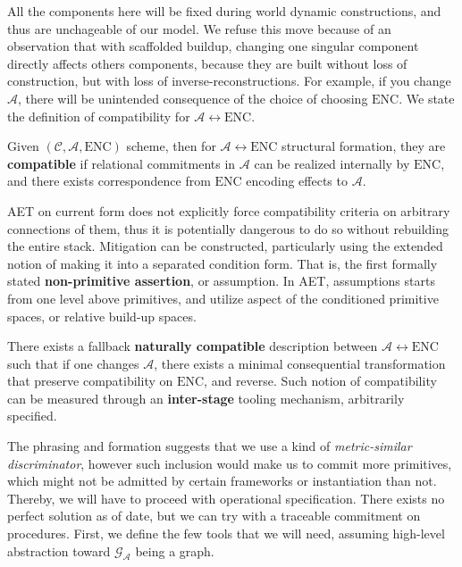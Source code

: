 All the components here will be fixed during world dynamic constructions, and thus are unchageable of our model. We refuse this move because of an observation that with scaffolded buildup, changing one singular component directly affects others components, because they are built without loss of construction, but with loss of inverse-reconstructions. For example, if you change $\mathcal{A}$, there will be unintended consequence of the choice of choosing $\mathrm{ENC}$. We state the definition of compatibility for $\mathcal{A}\leftrightarrow \mathrm{ENC}$. 
\begin{definition}
	Given $(\mathcal{C},\mathcal{A},\mathrm{ENC})$ scheme, then for $\mathcal{A}\leftrightarrow \mathrm{ENC}$ structural formation, they are \textbf{compatible} if relational commitments in $\mathcal{A}$ can be realized internally by $\mathrm{ENC}$, and there exists correspondence from $\mathrm{ENC}$ encoding effects to $\mathcal{A}$. 
\end{definition}
AET on current form does not explicitly force compatibility criteria on arbitrary connections of them, thus it is potentially dangerous to do so without rebuilding the entire stack. Mitigation can be constructed, particularly using the extended notion of making it into a separated condition form. That is, the first formally stated \textbf{non-primitive assertion}, or assumption. In AET, assumptions starts from one level above primitives, and utilize aspect of the conditioned primitive spaces, or relative build-up spaces. 
\begin{assumption}[Naturalness]
	There exists a fallback \textbf{naturally compatible} description between $\mathcal{A}\leftrightarrow \mathrm{ENC}$ such that if one changes $\mathcal{A}$, there exists a minimal consequential transformation that preserve compatibility on $\mathrm{ENC}$, and reverse. Such notion of compatibility can be measured through an \textbf{inter-stage} tooling mechanism, arbitrarily specified. 
\end{assumption}
The phrasing and formation suggests that we use a kind of \textit{metric-similar discriminator}, however such inclusion would make us to commit more primitives, which might not be admitted by certain frameworks or instantiation than not. Thereby, we will have to proceed with operational specification. There exists no perfect solution as of date, but we can try with a traceable commitment on procedures. First, we define the few tools that we will need, assuming high-level abstraction toward $\mathcal{G}_{\mathcal{A}}$ being a graph. 
